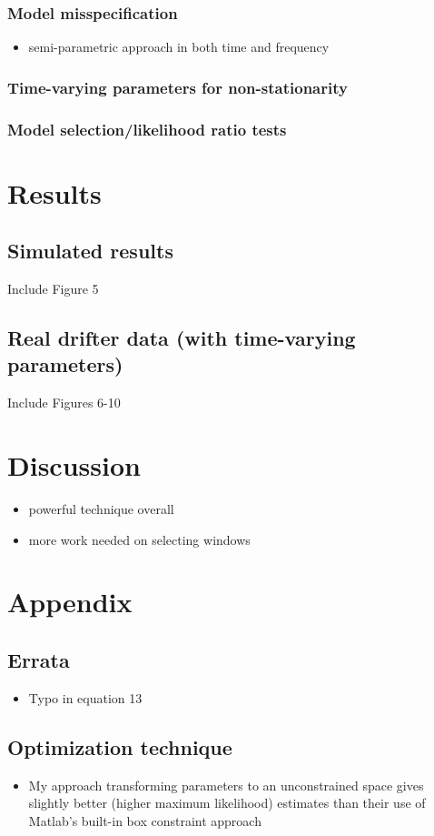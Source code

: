 \documentclass{stat572Style}
\begin{document}
		\subsubsection{Model misspecification}
			\begin{itemize}
				\item semi-parametric approach in both time and frequency
			\end{itemize}
		\subsubsection{Time-varying parameters for non-stationarity}
		
		\subsubsection{Model selection/likelihood ratio tests}
	



\section{Results}

	\subsection{Simulated results}
		Include Figure 5
		
	\subsection{Real drifter data (with time-varying parameters)}
		Include Figures 6-10

\section{Discussion}
	\begin{itemize}
		\item powerful technique overall
		\item more work needed on selecting windows
	\end{itemize}

\section{Appendix}

\subsection{Errata}
	\begin{itemize}
		\item Typo in equation 13
	\end{itemize}

\subsection{Optimization technique}
	\begin{itemize}
		\item My approach transforming parameters to an unconstrained space gives slightly better (higher maximum likelihood) estimates than their use of Matlab's built-in box constraint approach
			\end{itemize}



\end{document}

